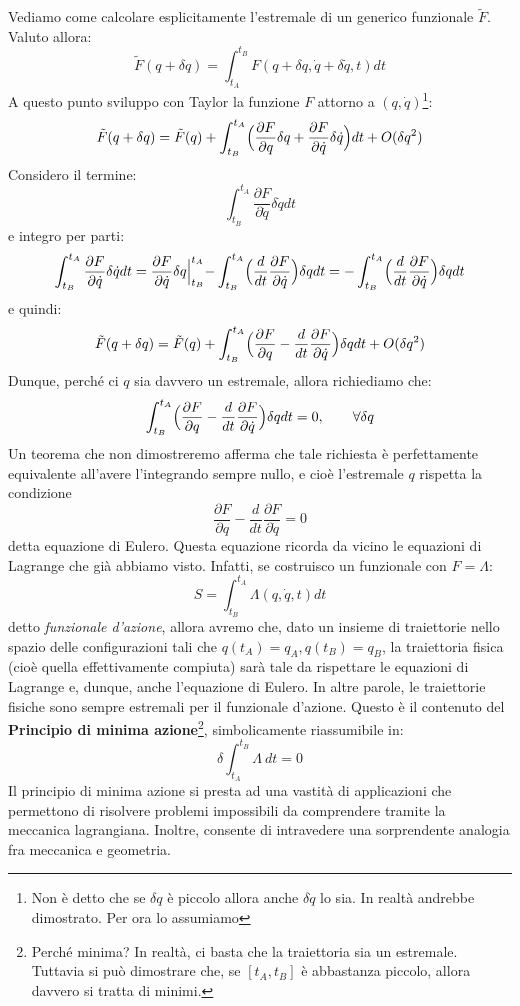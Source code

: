 \documentclass[a4paper,openany]{article}
\begin{document}
	
	Vediamo come calcolare esplicitamente l'estremale di un generico funzionale $\tilde{F}$. Valuto allora:
	$$
	\tilde{F}(q+\delta q) = \int_{t_A}^{t_B}F(q+\delta q, \dot{q}+\delta \dot{q},t)dt
	$$
	A questo punto sviluppo con Taylor la funzione $F$ attorno a $(q,	\dot{q})$\footnote{Non è detto che se $\delta q $ è piccolo allora anche $\delta \dot{q}$ lo sia. In realtà andrebbe dimostrato. Per ora lo assumiamo}:
	$$
	\tilde{F}(q+\delta q) = \tilde{F} (q) + \int_{t_B}^{t_A}\Bigl(\dfrac{\partial F}{\partial q}\delta q+\dfrac{\partial F}{\partial \dot{q}}\delta \dot{q}\Bigl)dt + O(\delta q^2)
	$$
	Considero il termine:
	$$
	\int_{t_B}^{t_A}\dfrac{\partial F}{\partial \dot{q}}\delta \dot{q}dt
	$$
	e integro per parti:
	$$
	\int_{t_B}^{t_A}\dfrac{\partial F}{\partial \dot{q}}\delta \dot{q}dt = \dfrac{\partial F}{\partial \dot{q}}\delta q \Bigl|_{t_B}^{t_A} - \int_{t_B}^{t_A}\Bigl(\dfrac{d}{dt}\dfrac{\partial F}{\partial \dot{q}}\Bigl)\delta qdt = - \int_{t_B}^{t_A}\Bigl(\dfrac{d}{dt}\dfrac{\partial F}{\partial \dot{q}}\Bigl)\delta q dt
	$$
	e quindi:
	$$
	\tilde{F}(q+\delta q) = \tilde{F} (q) + \int_{t_B}^{t_A}\Bigl(\dfrac{\partial F}{\partial q}-\dfrac{d}{dt}\dfrac{\partial F}{\partial \dot{q}}\Bigl)\delta qdt + O(\delta q^2)
	$$
	Dunque, perché ci $q$ sia davvero un estremale, allora richiediamo che:
	$$
	\int_{t_B}^{t_A}\Bigl(\dfrac{\partial F}{\partial q}-\dfrac{d}{dt}\dfrac{\partial F}{\partial \dot{q}}\Bigl)\delta qdt = 0, \qquad \forall \delta q
	$$
	Un teorema che non dimostreremo afferma che tale richiesta è perfettamente equivalente all'avere l'integrando sempre nullo, e cioè l'estremale $q$ rispetta la condizione
	$$
	\dfrac{\partial F}{\partial q}-\dfrac{d}{dt}\dfrac{\partial F}{\partial \dot{q}} = 0
	$$
	detta equazione di Eulero. Questa equazione ricorda da vicino le equazioni di Lagrange che già abbiamo visto. Infatti, se costruisco un funzionale con $F= \Lambda$:
	\begin{equation}\label{key}
		S = \int_{t_B}^{t_A} \Lambda(q,\dot{q},t) dt
	\end{equation}
	detto \textit{funzionale d'azione}, allora avremo che, dato un insieme di traiettorie nello spazio delle configurazioni tali che $q(t_A) = q_A, q(t_B) = q_B$, la traiettoria fisica (cioè quella effettivamente compiuta) sarà tale da rispettare le equazioni di Lagrange e, dunque, anche l'equazione di Eulero. In altre parole, le traiettorie fisiche sono sempre estremali per il funzionale d'azione. Questo è il contenuto del \textbf{Principio di minima azione}\footnote{Perché minima? In realtà, ci basta che la traiettoria sia un estremale. Tuttavia si può dimostrare che, se $[t_A, t_B]$ è abbastanza piccolo, allora davvero si tratta di minimi.}, simbolicamente riassumibile in:
	\begin{equation}\label{key}
		\delta \int_{t_A}^{t_B}\Lambda \> dt = 0
	\end{equation}
	Il principio di minima azione si presta ad una vastità di applicazioni che permettono di risolvere problemi impossibili da comprendere tramite la meccanica lagrangiana. Inoltre, consente di intravedere una sorprendente analogia fra meccanica e geometria.
	
\end{document}
